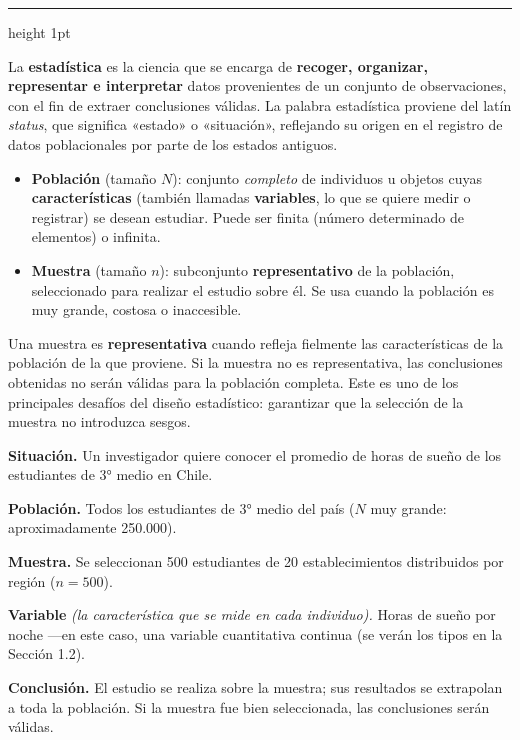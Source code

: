 \documentclass[11pt, letterpaper]{article}
\newcommand{\subbloque}[1]{%
  \vspace{14pt}
  \noindent{\large\bfseries\color{zenitnavy} #1}\par
  \vspace{4pt}\hrule height 1pt\vspace{8pt}}
\begin{document}
\subbloque{1.1 Población, muestra y variable}
\label{sub:1.1}

\begin{tcolorbox}[importantbox, title={Definición: Estadística}]
La \textbf{estadística} es la ciencia que se encarga de \textbf{recoger, organizar, representar e interpretar} datos provenientes de un conjunto de observaciones, con el fin de extraer conclusiones válidas. La palabra estadística proviene del latín \textit{status}, que significa «estado» o «situación», reflejando su origen en el registro de datos poblacionales por parte de los estados antiguos.
\end{tcolorbox}

\begin{tcolorbox}[importantbox, title={Definiciones: Población y muestra}]
\begin{itemize}
  \item \textbf{Población} (tamaño $N$): conjunto \textit{completo} de individuos u objetos cuyas \textbf{características} (también llamadas \textbf{variables}, lo que se quiere medir o registrar) se desean estudiar. Puede ser finita (número determinado de elementos) o infinita.
  \item \textbf{Muestra} (tamaño $n$): subconjunto \textbf{representativo} de la población, seleccionado para realizar el estudio sobre él. Se usa cuando la población es muy grande, costosa o inaccesible.
\end{itemize}

\smallskip
Una muestra es \textbf{representativa} cuando refleja fielmente las características de la población de la que proviene. Si la muestra no es representativa, las conclusiones obtenidas no serán válidas para la población completa. Este es uno de los principales desafíos del diseño estadístico: garantizar que la selección de la muestra no introduzca sesgos.
\end{tcolorbox}

\begin{tcolorbox}[examplebox, title={Ej. 1. Población y muestra}]
\noindent\textbf{Situación.} Un investigador quiere conocer el promedio de horas de sueño de los estudiantes de 3° medio en Chile.
\medskip

\noindent\textbf{Población.} Todos los estudiantes de 3° medio del país ($N$ muy grande: aproximadamente 250.000).
\medskip

\noindent\textbf{Muestra.} Se seleccionan 500 estudiantes de 20 establecimientos distribuidos por región ($n = 500$).
\medskip

\noindent\textbf{Variable} \textit{(la característica que se mide en cada individuo).} Horas de sueño por noche ---en este caso, una variable cuantitativa continua (se verán los tipos en la Sección 1.2).
\medskip

\noindent\textbf{Conclusión.} El estudio se realiza sobre la muestra; sus resultados se extrapolan a toda la población. Si la muestra fue bien seleccionada, las conclusiones serán válidas.

\end{tcolorbox}
\end{document}
